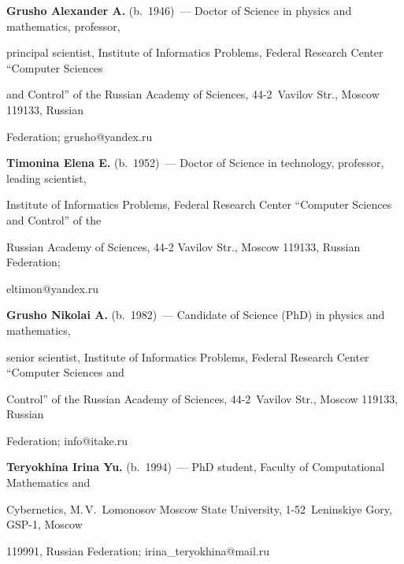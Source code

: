 




\Contr





\noindent


\textbf{Grusho Alexander A.} (b.\ 1946)~--- Doctor of Science in physics and mathematics, professor, 


principal scientist, Institute of Informatics Problems, Federal Research Center ``Computer Sciences 


and Control'' of the Russian Academy of Sciences, 44-2~Vavilov Str., Moscow 119133, Russian 


Federation;  \mbox{grusho@yandex.ru}





\vspace*{3pt}





\noindent


\textbf{Timonina Elena E.} (b.\ 1952)~--- Doctor of Science in technology, professor, leading scientist, 


Institute of Informatics Problems, Federal Research Center ``Computer Sciences and Control'' of the 


Russian Academy of Sciences, 44-2 Vavilov Str., Moscow 119133, Russian Federation; 


\mbox{eltimon@yandex.ru}





\vspace*{3pt}





\noindent


\textbf{Grusho Nikolai A.} (b.\ 1982)~--- Candidate of Science (PhD) in physics and mathematics, 


senior scientist, Institute of Informatics Problems, Federal Research Center ``Computer Sciences and 


Control'' of the Russian Academy of Sciences, 44-2~Vavilov Str., Moscow 119133, Russian 


Federation; \mbox{info@itake.ru}





\vspace*{3pt}





\noindent


\textbf{Teryokhina Irina Yu.} (b.\ 1994)~--- PhD student, Faculty of Computational Mathematics and 


Cybernetics, M.\,V.~Lomonosov Moscow State University, 1-52~Leninskiye Gory, GSP-1, Moscow 


119991, Russian Federation; \mbox{irina\_teryokhina@mail.ru}


\label{end\stat}





\renewcommand{\bibname}{\protect\rm Литература} 


